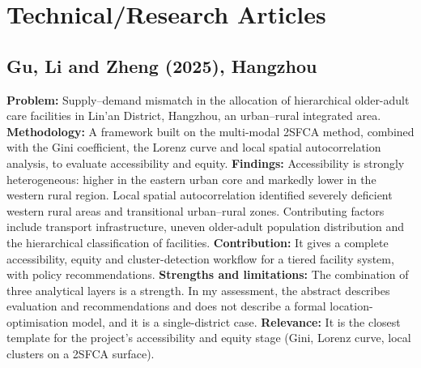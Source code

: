 \documentclass[pdflatex,sn-mathphys-num]{sn-jnl}
\begin{document}
\section{Technical/Research Articles}
\label{sec:technical}

\subsection{Gu, Li and Zheng (2025), Hangzhou \cite{eldercare2025}}
\textbf{Problem:} Supply--demand mismatch in the allocation of hierarchical older-adult care facilities in Lin'an District, Hangzhou, an urban--rural integrated area.
\textbf{Methodology:} A framework built on the multi-modal 2SFCA method, combined with the Gini coefficient, the Lorenz curve and local spatial autocorrelation analysis, to evaluate accessibility and equity.
\textbf{Findings:} Accessibility is strongly heterogeneous: higher in the eastern urban core and markedly lower in the western rural region. Local spatial autocorrelation identified severely deficient western rural areas and transitional urban--rural zones. Contributing factors include transport infrastructure, uneven older-adult population distribution and the hierarchical classification of facilities.
\textbf{Contribution:} It gives a complete accessibility, equity and cluster-detection workflow for a tiered facility system, with policy recommendations.
\textbf{Strengths and limitations:} The combination of three analytical layers is a strength. In my assessment, the abstract describes evaluation and recommendations and does not describe a formal location-optimisation model, and it is a single-district case.
\textbf{Relevance:} It is the closest template for the project's accessibility and equity stage (Gini, Lorenz curve, local clusters on a 2SFCA surface).
\end{document}
